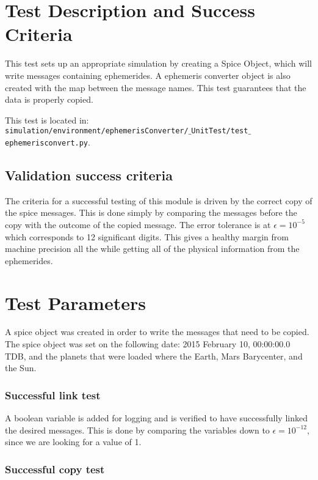 \section{Test Description and Success Criteria}

This test sets up an appropriate simulation by creating a Spice Object, which will write messages containing ephemerides. A ephemeris converter object is also created with the map between the message names. This test guarantees that the data is properly copied.

This test is located in: \\
{\tt simulation/environment/ephemerisConverter/$\_$UnitTest/test$\_$ephemerisconvert.py}. \par

\subsection{Validation success criteria }

The criteria for a successful testing of this module is driven by the correct copy of the spice messages. This is done simply by comparing the messages before the copy with the outcome of the copied message. The error tolerance is at $\epsilon =10^{-5}$ which corresponds to 12 significant digits. This gives a healthy margin from machine precision all the while getting all of the physical information from the ephemerides. 

\section{Test Parameters}

A spice object was created in order to write the messages that need to be copied.
The spice object was set on the following date: 2015 February 10, 00:00:00.0 TDB, and the planets that were loaded where the Earth, Mars Barycenter, and the Sun.

\subsubsection*{Successful link test}

A boolean variable is added for logging and is verified to have successfully linked the desired messages. This is done by comparing the variables down to $\epsilon =10^{-12}$, since we are looking for a value of 1.

\subsubsection*{Successful copy test}

